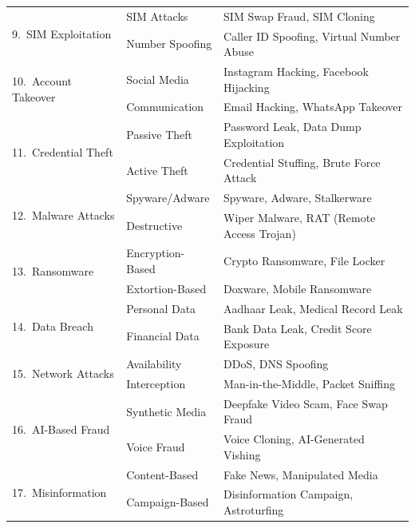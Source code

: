 \begin{table}[t]
\begin{tabular}{|l|l|p{7.5cm}|}
\multirow{2}{*}{9.\ SIM Exploitation}
  & SIM Attacks         & SIM Swap Fraud, SIM Cloning \\
  & Number Spoofing     & Caller ID Spoofing, Virtual Number Abuse \\
\hline

\multirow{2}{*}{10.\ Account Takeover}
  & Social Media        & Instagram Hacking, Facebook Hijacking \\
  & Communication       & Email Hacking, WhatsApp Takeover \\
\hline

\multirow{2}{*}{11.\ Credential Theft}
  & Passive Theft       & Password Leak, Data Dump Exploitation \\
  & Active Theft        & Credential Stuffing, Brute Force Attack \\
\hline

\multirow{2}{*}{12.\ Malware Attacks}
  & Spyware/Adware      & Spyware, Adware, Stalkerware \\
  & Destructive         & Wiper Malware, RAT (Remote Access Trojan) \\
\hline

\multirow{2}{*}{13.\ Ransomware}
  & Encryption-Based    & Crypto Ransomware, File Locker \\
  & Extortion-Based     & Doxware, Mobile Ransomware \\
\hline

\multirow{2}{*}{14.\ Data Breach}
  & Personal Data       & Aadhaar Leak, Medical Record Leak \\
  & Financial Data      & Bank Data Leak, Credit Score Exposure \\
\hline

\multirow{2}{*}{15.\ Network Attacks}
  & Availability        & DDoS, DNS Spoofing \\
  & Interception        & Man-in-the-Middle, Packet Sniffing \\
\hline

\multirow{2}{*}{16.\ AI-Based Fraud}
  & Synthetic Media     & Deepfake Video Scam, Face Swap Fraud \\
  & Voice Fraud         & Voice Cloning, AI-Generated Vishing \\
\hline

\multirow{2}{*}{17.\ Misinformation}
  & Content-Based       & Fake News, Manipulated Media \\
  & Campaign-Based      & Disinformation Campaign, Astroturfing \\
\hline


\end{tabular}
\end{table}
